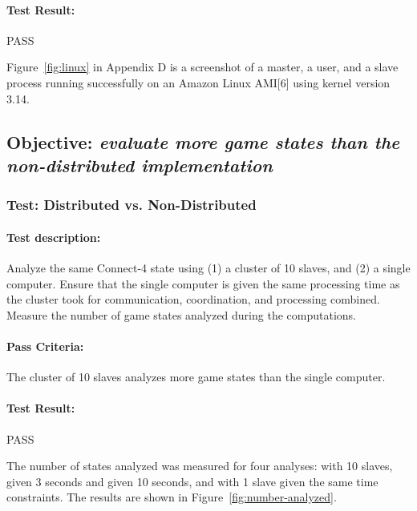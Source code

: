 \documentclass[pdftex,12pt,a4paper]{article}
\begin{document}
\paragraph{Test Result:} PASS

Figure~\ref{fig:linux} in Appendix D is a screenshot of a master, a user, and a slave process running successfully on an Amazon Linux AMI[6] using kernel version 3.14.



\subsection{\textbf{Objective:} \emph{evaluate more game states than the non-distributed implementation}}\label{sec:obj-number-analyzed}

\subsubsection{\textbf{Test:} Distributed vs. Non-Distributed}\label{sec:number-analyzed}

\paragraph{Test description:} Analyze the same Connect-4 state using (1) a cluster of 10 slaves, and (2) a single computer. Ensure that the single computer is given the same processing time as the cluster took for communication, coordination, and processing combined. Measure the number of game states analyzed during the computations.

\paragraph{Pass Criteria:} The cluster of 10 slaves analyzes more game states than the single computer.

\paragraph{Test Result:} PASS

The number of states analyzed was measured for four analyses: with 10 slaves, given 3 seconds and given 10 seconds, and with 1 slave given the same time constraints. The results are shown in Figure~\ref{fig:number-analyzed}.
\end{document}

